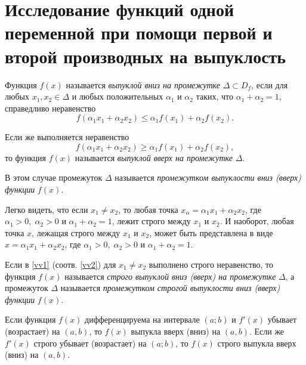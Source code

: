 \section{Исследование функций одной переменной при помощи первой и второй производных на выпуклость}

\begin{defn}
Функция $f(x)$ называется \textit{выпуклой вниз на промежутке} $\Delta\subset D_f$, если для любых $x_1,x_2\in\Delta$ и любых положительных $\alpha_1$ и $\alpha_2$ таких, что $\alpha_1+\alpha_2=1$, справедливо неравенство
\begin{equation} \label{vv1}
f(\alpha_1x_1+\alpha_2x_2) \leq \alpha_1f(x_1)+\alpha_2f(x_2).
\end{equation}

Если же выполняется неравенство
\begin{equation} \label{vv2}
f(\alpha_1x_1+\alpha_2x_2) \geq \alpha_1f(x_1)+\alpha_2f(x_2),
\end{equation}
то функция $f(x)$ называется \textit{выпуклой вверх на промежутке} $\Delta$.

В этом случае промежуток $\Delta$ называется \textit{промежутком выпуклости вниз \textup{(}вверх\textup{)} функции} $f(x)$.
\end{defn}

Легко видеть, что если $x_1\neq x_2$, то любая точка $x_\alpha=\alpha_1x_1+\alpha_2x_2$, где $\alpha_1>0,\;\alpha_2>0$ и $\alpha_1+\alpha_2=1$, лежит строго между $x_1$ и $x_2$. И наоборот, любая точка $x$, лежащая строго между $x_1$ и $x_2$, может быть представлена в виде $x=\alpha_1x_1+\alpha_2x_2$, где $\alpha_1>0,\;\alpha_2>0$ и $\alpha_1+\alpha_2=1$.

Если в \eqref{vv1} (соотв. \eqref{vv2}) для $x_1\neq x_2$ выполнено строго неравенство, то функция $f(x)$ называется \textit{строго выпуклой вниз \textup{(}вверх\textup{)} на промежутке} $\Delta$, а промежуток $\Delta$ называется \textit{промежутком строгой выпуклости вниз \textup{(вверх}\textup{)} функции} $f(x)$.

\begin{thm}
Если функция $f(x)$ дифференцируема на интервале $(a;b)$ и $f'(x)$ убывает \textup{(}возрастает\textup{)} на $(a,b)$, то $f(x)$ выпукла вверх (вниз) на $(a,b)$. Если же $f'(x)$ строго убывает \textup{(}возрастает\textup{)} на $(a;b)$, то $f(x)$ строго выпукла вверх \textup{(}вниз\textup{)} на $(a,b)$.
\end{thm}


